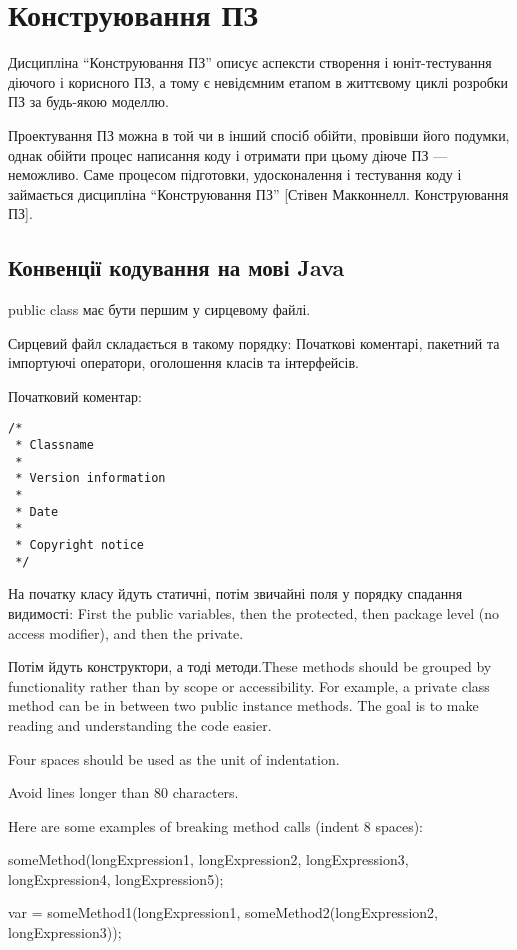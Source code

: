 \section{Конструювання ПЗ}
Дисципліна ``Конструювання ПЗ'' описує аспексти створення і юніт-тестування діючого і корисного ПЗ, а тому є невідємним етапом в життєвому циклі розробки ПЗ за будь-якою моделлю.

Проектування ПЗ можна в той чи в інший спосіб обійти, провівши його подумки, однак обійти процес написання коду і отримати при цьому діюче ПЗ --- неможливо. Саме процесом підготовки, удосконалення і тестування коду і займається дисципліна ``Конструювання ПЗ'' [Стівен Макконнелл. Конструювання ПЗ].
\subsection{Конвенції кодування на мові Java}
public class має бути першим у сирцевому файлі.

Сирцевий файл складається в такому порядку:
Початкові коментарі, пакетний та імпортуючі оператори, оголошення класів та інтерфейсів.

Початковий коментар:
\begin{lstlisting}
/*
 * Classname
 * 
 * Version information
 *
 * Date
 * 
 * Copyright notice
 */
\end{lstlisting}
 
 На початку класу йдуть статичні, потім звичайні поля у порядку спадання видимості: First the public variables, then the protected, then package level (no access modifier), and then the private.
 
 Потім йдуть конструктори, а тоді методи.These methods should be grouped by functionality rather than by scope or accessibility. For example, a private class method can be in between two public instance methods. The goal is to make reading and understanding the code easier.
 
 Four spaces should be used as the unit of indentation.
 
 Avoid lines longer than 80 characters.
 
Here are some examples of breaking method calls (indent 8 spaces):

someMethod(longExpression1, longExpression2, longExpression3, 
        longExpression4, longExpression5);
 
var = someMethod1(longExpression1,
                someMethod2(longExpression2,
                        longExpression3)); 
 
